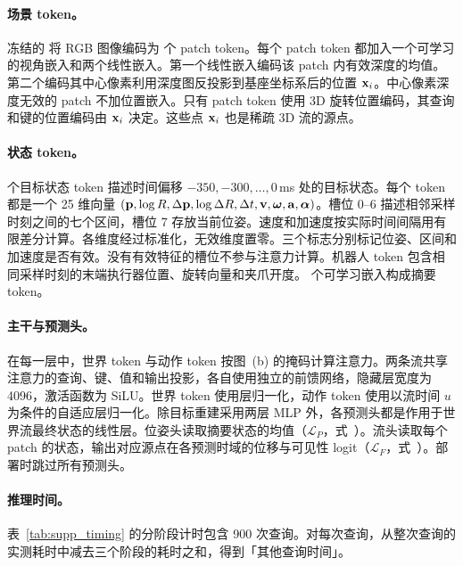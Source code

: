 \paragraph{场景 token。}
冻结的 \cfgVisualEncoder{} \cite{mae} 将 RGB 图像编码为 \cfgPatches{} 个 patch token。每个 patch token 都加入一个可学习的视角嵌入和两个线性嵌入。第一个线性嵌入编码该 patch 内有效深度的均值。第二个编码其中心像素利用深度图反投影到基座坐标系后的位置 $\mathbf{x}_i$。中心像素深度无效的 patch 不加位置嵌入。只有 patch token 使用 3D 旋转位置编码，其查询和键的位置编码由 $\mathbf{x}_i$ 决定。这些点 $\mathbf{x}_i$ 也是稀疏 3D 流的源点。

\paragraph{状态 token。}
\cfgHistoryLen{} 个目标状态 token 描述时间偏移 $-350,-300,\ldots,0$\,ms 处的目标状态。每个 token 都是一个 25 维向量 $(\mathbf{p},\allowbreak\log R,\allowbreak\Delta\mathbf{p},\allowbreak\log\Delta R,\allowbreak\Delta t,\allowbreak\mathbf{v},\allowbreak\boldsymbol\omega,\allowbreak\mathbf{a},\allowbreak\boldsymbol\alpha)$。槽位 0--6 描述相邻采样时刻之间的七个区间，槽位 7 存放当前位姿。速度和加速度按实际时间间隔用有限差分计算。各维度经过标准化，无效维度置零。三个标志分别标记位姿、区间和加速度是否有效。没有有效特征的槽位不参与注意力计算。机器人 token 包含相同采样时刻的末端执行器位置、旋转向量和夹爪开度。\cfgMetaTokens{} 个可学习嵌入构成摘要 token。

\paragraph{主干与预测头。}
在每一层中，世界 token 与动作 token 按图~(b) 的掩码计算注意力。两条流共享注意力的查询、键、值和输出投影，各自使用独立的前馈网络，隐藏层宽度为 4096，激活函数为 SiLU。世界 token 使用层归一化，动作 token 使用以流时间 $u$ 为条件的自适应层归一化。除目标重建采用两层 MLP 外，各预测头都是作用于世界流最终状态的线性层。位姿头读取摘要状态的均值（$\mathcal L_P$，式~）。流头读取每个 patch 的状态，输出对应源点在各预测时域的位移与可见性 logit（$\mathcal L_F$，式~）。部署时跳过所有预测头。

\paragraph{推理时间。}
\label{app:latency_results}
表~\ref{tab:supp_timing} 的分阶段计时包含 900 次查询。对每次查询，从整次查询的实测耗时中减去三个阶段的耗时之和，得到「其他查询时间」。

